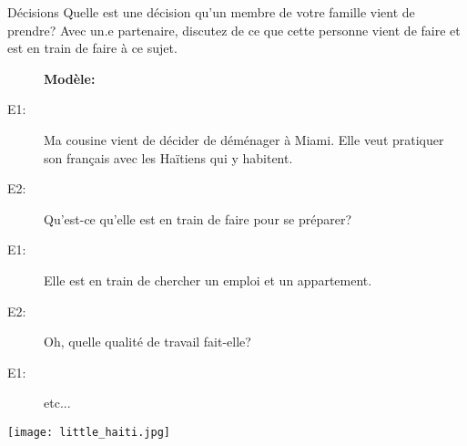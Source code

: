 \begin{frame}{Décisions}
  Quelle est une décision qu'un membre de votre famille \alert{vient de} prendre?
  Avec un.e partenaire, discutez de ce que cette personne vient de faire et \alert{est en train de} faire à ce sujet.
  \begin{description}
    \item[] \textbf{Modèle:}
    \item[E1:] Ma cousine \alert{vient de} décider de déménager à Miami. Elle veut pratiquer son français avec les Haïtiens qui y habitent.
    \item[E2:] Qu'est-ce qu'elle \alert{est en train de} faire pour se préparer?
    \item[E1:] Elle \alert{est en train de} chercher un emploi et un appartement.
    \item[E2:] Oh, quelle qualité de travail fait-elle?
    \item[E1:] etc...
  \end{description}
  \begin{center}
    \texttt{[image: little\_haiti.jpg]}
  \end{center}
\end{frame}